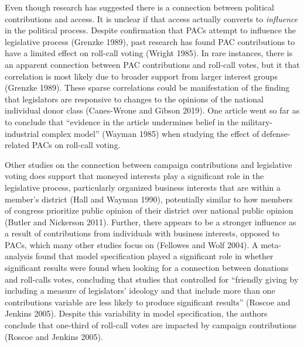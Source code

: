 \documentclass[12pt,]{article}
\begin{document}
Even though research has suggested there is a connection between
political contributions and access. It is unclear if that access
actually converts to \emph{influence} in the political process. Despite
confirmation that PACs attempt to influence the legislative process
(Grenzke 1989), past research has found PAC contributions to have a
limited effect on roll-call voting (Wright 1985). In rare instances,
there is an apparent connection between PAC contributions and roll-call
votes, but it that correlation is most likely due to broader support
from larger interest groups (Grenzke 1989). These sparse correlations
could be manifestation of the finding that legislators are responsive to
changes to the opinions of the national individual donor class
(Canes-Wrone and Gibson 2019). One article went so far as to conclude
that ``evidence in the article undermines belief in the
military-industrial complex model'' (Wayman 1985) when studying the
effect of defense-related PACs on roll-call voting.

Other studies on the connection between campaign contributions and
legislative voting does support that moneyed interests play a
significant role in the legislative process, particularly organized
business interests that are within a member's district (Hall and Wayman
1990), potentially similar to how members of congress prioritize public
opinion of their district over national public opinion (Butler and
Nickerson 2011). Further, there appears to be a stronger influence as a
result of contributions from individuals with business interests,
opposed to PACs, which many other studies focus on (Fellowes and Wolf
2004). A meta-analysis found that model specification played a
significant role in whether significant results were found when looking
for a connection between donations and roll-calls votes, concluding that
studies that controlled for ``friendly giving by including a measure of
legislators' ideology and that include more than one contributions
variable are less likely to produce significant results'' (Roscoe and
Jenkins 2005). Despite this variability in model specification, the
authors conclude that one-third of roll-call votes are impacted by
campaign contributions (Roscoe and Jenkins 2005).
\end{document}
